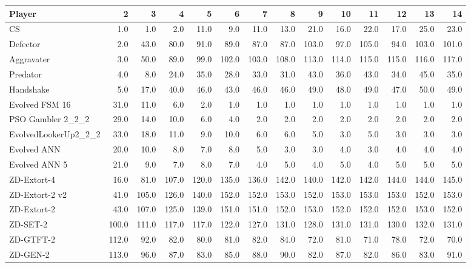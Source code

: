 \begin{tabular}{lrrrrrrrrrrrrr}
\toprule
               Player &      2 &      3 &      4 &      5 &      6 &      7 &      8 &      9 &     10 &     11 &     12 &     13 &     14 \\
\midrule
                   CS &    1.0 &    1.0 &    2.0 &   11.0 &    9.0 &   11.0 &   13.0 &   21.0 &   16.0 &   22.0 &   17.0 &   25.0 &   23.0 \\
             Defector &    2.0 &   43.0 &   80.0 &   91.0 &   89.0 &   87.0 &   87.0 &  103.0 &   97.0 &  105.0 &   94.0 &  103.0 &  101.0 \\
           Aggravater &    3.0 &   50.0 &   89.0 &   99.0 &  102.0 &  103.0 &  108.0 &  113.0 &  114.0 &  115.0 &  115.0 &  116.0 &  117.0 \\
             Predator &    4.0 &    8.0 &   24.0 &   35.0 &   28.0 &   33.0 &   31.0 &   43.0 &   36.0 &   43.0 &   34.0 &   45.0 &   35.0 \\
            Handshake &    5.0 &   17.0 &   40.0 &   46.0 &   43.0 &   46.0 &   46.0 &   49.0 &   48.0 &   49.0 &   47.0 &   50.0 &   49.0 \\
       Evolved FSM 16 &   31.0 &   11.0 &    6.0 &    2.0 &    1.0 &    1.0 &    1.0 &    1.0 &    1.0 &    1.0 &    1.0 &    1.0 &    1.0 \\
    PSO Gambler 2\_2\_2 &   29.0 &   14.0 &   10.0 &    6.0 &    4.0 &    2.0 &    2.0 &    2.0 &    2.0 &    2.0 &    2.0 &    2.0 &    2.0 \\
 EvolvedLookerUp2\_2\_2 &   33.0 &   18.0 &   11.0 &    9.0 &   10.0 &    6.0 &    6.0 &    5.0 &    3.0 &    5.0 &    3.0 &    3.0 &    3.0 \\
          Evolved ANN &   20.0 &   10.0 &    8.0 &    7.0 &    8.0 &    5.0 &    3.0 &    3.0 &    4.0 &    3.0 &    4.0 &    4.0 &    4.0 \\
        Evolved ANN 5 &   21.0 &    9.0 &    7.0 &    8.0 &    7.0 &    4.0 &    5.0 &    4.0 &    5.0 &    4.0 &    5.0 &    5.0 &    5.0 \\
          ZD-Extort-4 &   16.0 &   81.0 &  107.0 &  120.0 &  135.0 &  136.0 &  142.0 &  140.0 &  142.0 &  142.0 &  144.0 &  144.0 &  145.0 \\
       ZD-Extort-2 v2 &   41.0 &  105.0 &  126.0 &  140.0 &  152.0 &  152.0 &  153.0 &  152.0 &  153.0 &  153.0 &  153.0 &  152.0 &  153.0 \\
          ZD-Extort-2 &   43.0 &  107.0 &  125.0 &  139.0 &  151.0 &  151.0 &  152.0 &  153.0 &  152.0 &  152.0 &  152.0 &  153.0 &  152.0 \\
             ZD-SET-2 &  100.0 &  111.0 &  117.0 &  117.0 &  122.0 &  127.0 &  131.0 &  128.0 &  131.0 &  131.0 &  130.0 &  132.0 &  131.0 \\
            ZD-GTFT-2 &  112.0 &   92.0 &   82.0 &   80.0 &   81.0 &   82.0 &   84.0 &   72.0 &   81.0 &   71.0 &   78.0 &   72.0 &   70.0 \\
             ZD-GEN-2 &  113.0 &   96.0 &   87.0 &   83.0 &   85.0 &   88.0 &   90.0 &   82.0 &   87.0 &   82.0 &   86.0 &   83.0 &   91.0 \\
\bottomrule
\end{tabular}

